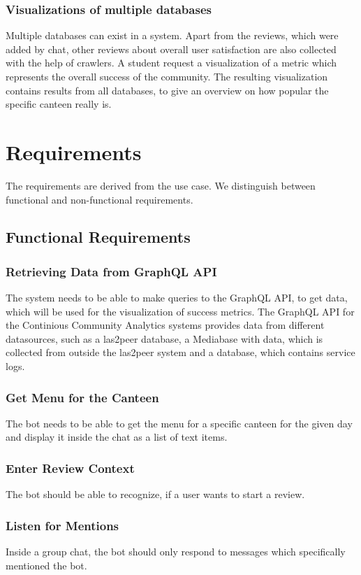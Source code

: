 \subsubsection{Visualizations of multiple databases} Multiple databases can exist in a system. Apart from the reviews, which were added by chat, other reviews about overall user satisfaction are also collected with the help of crawlers. A student request a visualization of a metric which represents the overall success of the community. The resulting visualization contains results from all databases, to give an overview on how popular the specific canteen really is.

\section{Requirements}
The requirements are derived from the use case. We distinguish between functional and non-functional requirements.
\subsection{Functional Requirements}

\subsubsection{Retrieving Data from GraphQL API}
The system needs to be able to make queries to the GraphQL API, to get data, which will be used for the visualization of success metrics. The GraphQL API  for the Continious Community Analytics systems provides data from different datasources, such as a las2peer database, a Mediabase with data, which is collected from outside the las2peer system and a database, which contains service logs.

\subsubsection{Get Menu for the Canteen} The bot needs to be able to get the menu for a specific canteen for the given day and display it inside the chat as a list of text items.

\subsubsection{Enter Review Context} The bot should be able to recognize, if a user wants to start a review.

\subsubsection{Listen for Mentions} Inside a group chat, the bot should only respond to messages which specifically mentioned the bot.


